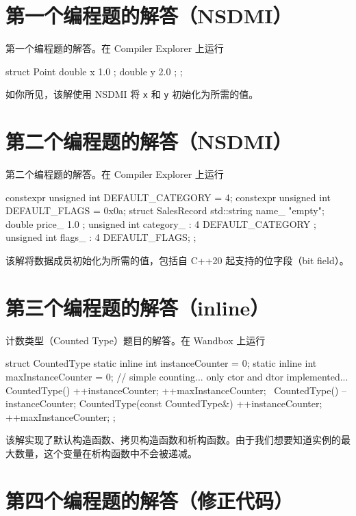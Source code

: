 \section{第一个编程题的解答（NSDMI）}

第一个编程题的解答。在 Compiler Explorer 上运行

\begin{codebox}[cpp]
struct Point {
double x { 1.0 };
double y { 2.0 };
};
\end{codebox}

如你所见，该解使用 NSDMI 将 \texttt{x} 和 \texttt{y} 初始化为所需的值。

\section{第二个编程题的解答（NSDMI）}

第二个编程题的解答。在 Compiler Explorer 上运行

\begin{codebox}[cpp]
constexpr unsigned int DEFAULT_CATEGORY = 4;
constexpr unsigned int DEFAULT_FLAGS = 0x0a;
struct SalesRecord {
std::string name_ {"empty"};
double price_ { 1.0 };
unsigned int category_ : 4 { DEFAULT_CATEGORY };
unsigned int flags_ : 4 { DEFAULT_FLAGS};
};
\end{codebox}

该解将数据成员初始化为所需的值，包括自 C++20 起支持的位字段（bit field）。

\section{第三个编程题的解答（inline）}

计数类型（Counted Type）题目的解答。在 Wandbox 上运行

\begin{codebox}[cpp]
struct CountedType {
static inline int instanceCounter = 0;
static inline int maxInstanceCounter = 0;
// simple counting... only ctor and dtor implemented...
CountedType() { ++instanceCounter; ++maxInstanceCounter; }
~CountedType() { --instanceCounter; }
CountedType(const CountedType&) { ++instanceCounter; ++maxInstanceCounter; }
};
\end{codebox}

该解实现了默认构造函数、拷贝构造函数和析构函数。由于我们想要知道实例的最大数量，这个变量在析构函数中不会被递减。

\section{第四个编程题的解答（修正代码）}

